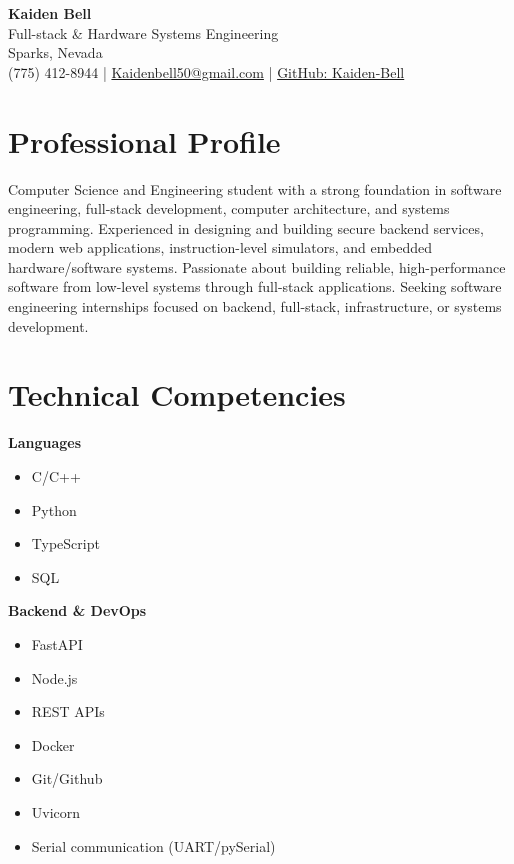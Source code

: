 \documentclass[10pt]{article}
\begin{document}
\begin{center}
    {\Huge \textbf{Kaiden Bell}} \\[6pt]
    Full-stack \& Hardware Systems Engineering \\[6pt]
    Sparks, Nevada \\
    (775) 412-8944 \quad | \quad 
    \href{mailto:Kaidenbell50@gmail.com}{Kaidenbell50@gmail.com} \quad | \quad
    \href{https://github.com/Kaiden-Bell}{GitHub: Kaiden-Bell}
\end{center}

\section*{Professional Profile}

Computer Science and Engineering student with a strong foundation in software engineering, full-stack development, computer architecture, and systems programming. Experienced in designing and building secure backend services, modern web applications, instruction-level simulators, and embedded hardware/software systems. Passionate about building reliable, high-performance software from low-level systems through full-stack applications. Seeking software engineering internships focused on backend, full-stack, infrastructure, or systems development.

\section*{Technical Competencies}

\textbf{Languages}
\begin{itemize}
    \item C/C++
    \item Python
    \item TypeScript
    \item SQL
\end{itemize}

\textbf{Backend \& DevOps}
\begin{itemize}
    \item FastAPI
    \item Node.js
    \item REST APIs
    \item Docker
    \item Git/Github
    \item Uvicorn
    \item Serial communication (UART/pySerial)
\end{itemize}
\end{document}
